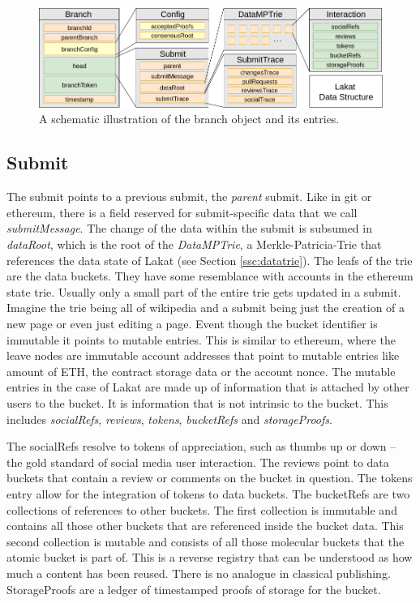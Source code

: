 \documentclass[14pt]{article}
\begin{document}
\begin{figure}[t!]
\begin{center}
\includegraphics[width=\textwidth]{img/BranchV6.png}
\end{center}
 \caption{A schematic illustration of the branch object and its entries.}
 \label{fig:branchstructure}
\end{figure}


\subsection{Submit}
\label{ssc:submit}
The submit points to a previous submit, the \textit{parent} submit. Like in git or ethereum, there is a field reserved for submit-specific data that we call \textit{submitMessage}. The change of the data within the submit is subsumed in \textit{dataRoot}, which is the root of the \textit{DataMPTrie}, a Merkle-Patricia-Trie that references the data state of Lakat (see Section \ref{ssc:datatrie}). The leafs of the trie are the data buckets. They have some resemblance with accounts in the ethereum state trie. Usually only a small part of the entire trie gets updated in a submit. Imagine the trie being all of wikipedia and a submit being just the creation of a new page or even just editing a page. Event though the bucket identifier is immutable it points to mutable entries. This is similar to ethereum, where the leave nodes are immutable account addresses that point to mutable entries like amount of ETH, the contract storage data or the account nonce. The mutable entries in the case of Lakat are made up of information that is attached by other users to the bucket. It is information that is not intrinsic to the bucket. This includes \textit{socialRefs}, \textit{reviews}, \textit{tokens}, \textit{bucketRefs} and \textit{storageProofs}. 

The socialRefs resolve to tokens of appreciation, such as thumbs up or down -- the gold standard of social media user interaction. The reviews point to data buckets that contain a review or comments on the bucket in question. The tokens entry allow for the integration of tokens to data buckets. The bucketRefs are two collections of references to other buckets. The first collection is immutable and contains all those other buckets that are referenced inside the bucket data. This second collection is mutable and consists of all those molecular buckets that the atomic bucket is part of. This is a reverse registry that can be understood as how much a content has been reused. There is no analogue in classical publishing. StorageProofs are a ledger of timestamped proofs of storage for the bucket.  
\end{document}
